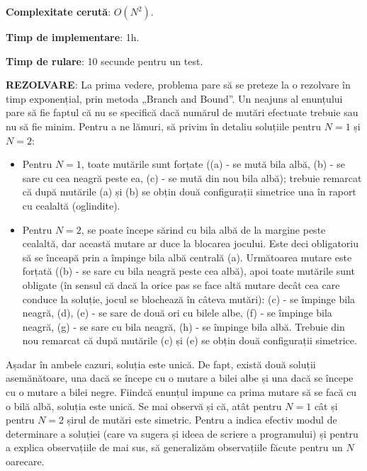{\bf Complexitate cerută}: $O(N^2)$.

{\bf Timp de implementare}: 1h.

{\bf Timp de rulare}: 10 secunde pentru un test.

{\bf REZOLVARE}: La prima vedere, problema pare să se preteze la o rezolvare
în timp exponențial, prin metoda „Branch and Bound”. Un neajuns al enunțului
pare să fie faptul că nu se specifică dacă numărul de mutări efectuate trebuie
sau nu să fie minim. Pentru a ne lămuri, să privim în detaliu soluțiile pentru
$N=1$ și $N=2$:

\begin{itemize}

\item Pentru $N = 1$, toate mutările sunt forțate ((a) - se mută bila albă,
  (b) - se sare cu cea neagră peste ea, (c) - se mută din nou bila albă);
  trebuie remarcat că după mutările (a) și (b) se obțin două configurații
  simetrice una în raport cu cealaltă (oglindite).

\item Pentru $N = 2$, se poate începe sărind cu bila albă de la margine peste
  cealaltă, dar această mutare ar duce la blocarea jocului. Este deci
  obligatoriu să se înceapă prin a împinge bila albă centrală (a). Următoarea
  mutare este forțată ((b) - se sare cu bila neagră peste cea albă), apoi
  toate mutările sunt obligate (în sensul că dacă la orice pas se face altă
  mutare decât cea care conduce la soluție, jocul se blochează în câteva
  mutări): (c) - se împinge bila neagră, (d), (e) - se sare de două ori cu
  bilele albe, (f) - se împinge bila neagră, (g) - se sare cu bila neagră, (h)
  - se împinge bila albă. Trebuie din nou remarcat că după mutările (c) și (e)
  se obțin două configurații simetrice.

\end{itemize}

Așadar în ambele cazuri, soluția este unică. De fapt, există două soluții
asemănătoare, una dacă se începe cu o mutare a bilei albe și una dacă se
începe cu o mutare a bilei negre. Fiindcă enunțul impune ca prima mutare să se
facă cu o bilă albă, soluția este unică. Se mai observă și că, atât pentru
$N=1$ cât și pentru $N=2$ șirul de mutări este simetric. Pentru a indica
efectiv modul de determinare a soluției (care va sugera și ideea de scriere a
programului) și pentru a explica observațiile de mai sus, să generalizăm
observațiile făcute pentru un $N$ oarecare.



